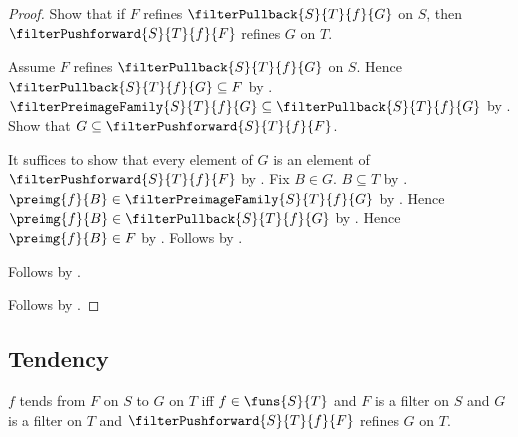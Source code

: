 \begin{proof}
    Show that if $F$ refines $\filterPullback{S}{T}{f}{G}$ on $S$,
        then $\filterPushforward{S}{T}{f}{F}$ refines $G$ on $T$.
    \begin{subproof}
        Assume $F$ refines $\filterPullback{S}{T}{f}{G}$ on $S$.
        Hence $\filterPullback{S}{T}{f}{G}\subseteq F$ by
            .
        $\filterPreimageFamily{S}{T}{f}{G}
            \subseteq\filterPullback{S}{T}{f}{G}$ by
            .
        Show that $G\subseteq\filterPushforward{S}{T}{f}{F}$.
        \begin{subproof}
            It suffices to show that every element of $G$ is an element of
                $\filterPushforward{S}{T}{f}{F}$ by .
            Fix $B\in G$.
            $B\subseteq T$ by .
            $\preimg{f}{B}\in\filterPreimageFamily{S}{T}{f}{G}$ by
                .
            Hence $\preimg{f}{B}\in\filterPullback{S}{T}{f}{G}$ by
                .
            Hence $\preimg{f}{B}\in F$ by .
            Follows by .
        \end{subproof}
        Follows by .
    \end{subproof}
    Follows by \auto.
\end{proof}

\subsection{Tendency}

\begin{definition}\label{filter_tendsto}
    $f$ tends from $F$ on $S$ to $G$ on $T$ iff
        $f\in\funs{S}{T}$ and $F$ is a filter on $S$ and
        $G$ is a filter on $T$ and
        $\filterPushforward{S}{T}{f}{F}$ refines $G$ on $T$.
\end{definition}

